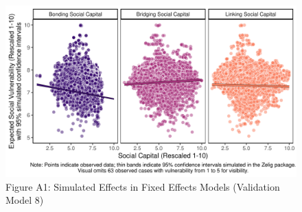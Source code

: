 \documentclass[]{elsarticle} %
\newcommand{\blandscape}{\begin{landscape}}
\newcommand{\elandscape}{\end{landscape}}
\begin{document}
\blandscape

\begin{figure}
\includegraphics[width=1\linewidth]{fixed_effect_ev} \caption{Figure A1: Simulated Effects in Fixed Effects Models (Validation Model 8)}\label{fig:figa1}
\end{figure}
\elandscape
\end{document}
